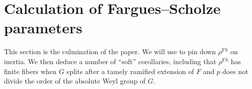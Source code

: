 \documentclass[reqno]{amsart}
\numberwithin{equation}{subsection}
\newcommand{\wh}[1]{\widehat{#1}}
\newcommand\cS{\mathcal{S}}
\DeclareMathOperator{\FS}{FS}
\DeclareMathOperator{\red}{red}
\DeclareMathOperator{\Kal}{Kal}
\theoremstyle{remark}
\numberwithin{equation}{subsection}
\numberwithin{figure}{subsection}
\begin{document}




\section{Calculation of Fargues--Scholze parameters}\label{section:fs-calculation}

This section is the culmination of the paper. We will use \cite[Theorem~10.2.1]{CF26a} to pin down $\rho^{\FS}$ on inertia. We then deduce a number of ``soft'' corollaries, including that $\rho^{\FS}$ has finite fibers when $G$ splits after a tamely ramified extension of $F$ and $p$ does not divide the order of the absolute Weyl group of $G$.
\end{document}
